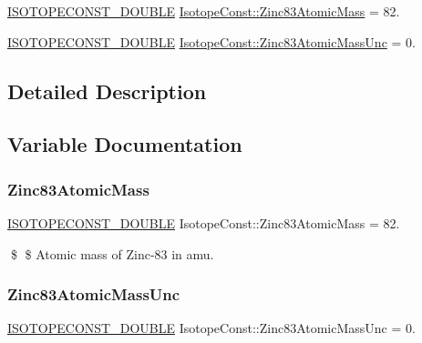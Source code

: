 \begin{DoxyCompactItemize}
\item 
\mbox{\hyperlink{group___isotope_const-_macros_ga8f45a7272ce02c0b4c65c44636ed719a}{I\+S\+O\+T\+O\+P\+E\+C\+O\+N\+S\+T\+\_\+\+D\+O\+U\+B\+LE}} \mbox{\hyperlink{group___isotope_const-_zinc-_zn83_gacfdde01fd0df7ff864f4a9a940978585}{Isotope\+Const\+::\+Zinc83\+Atomic\+Mass}} = 82.
\item 
\mbox{\hyperlink{group___isotope_const-_macros_ga8f45a7272ce02c0b4c65c44636ed719a}{I\+S\+O\+T\+O\+P\+E\+C\+O\+N\+S\+T\+\_\+\+D\+O\+U\+B\+LE}} \mbox{\hyperlink{group___isotope_const-_zinc-_zn83_gad2eb422eec9bb0897e5acf2d842ec742}{Isotope\+Const\+::\+Zinc83\+Atomic\+Mass\+Unc}} = 0.
\end{DoxyCompactItemize}


\subsection{Detailed Description}


\subsection{Variable Documentation}
\mbox{\label{group___isotope_const-_zinc-_zn83_gacfdde01fd0df7ff864f4a9a940978585}} 
\subsubsection{\texorpdfstring{Zinc83\+Atomic\+Mass}{Zinc83AtomicMass}}
{\footnotesize\ttfamily \mbox{\hyperlink{group___isotope_const-_macros_ga8f45a7272ce02c0b4c65c44636ed719a}{I\+S\+O\+T\+O\+P\+E\+C\+O\+N\+S\+T\+\_\+\+D\+O\+U\+B\+LE}} Isotope\+Const\+::\+Zinc83\+Atomic\+Mass = 82.}

\$ \$ Atomic mass of Zinc-\/83 in amu. \mbox{\label{group___isotope_const-_zinc-_zn83_gad2eb422eec9bb0897e5acf2d842ec742}} 
\subsubsection{\texorpdfstring{Zinc83\+Atomic\+Mass\+Unc}{Zinc83AtomicMassUnc}}
{\footnotesize\ttfamily \mbox{\hyperlink{group___isotope_const-_macros_ga8f45a7272ce02c0b4c65c44636ed719a}{I\+S\+O\+T\+O\+P\+E\+C\+O\+N\+S\+T\+\_\+\+D\+O\+U\+B\+LE}} Isotope\+Const\+::\+Zinc83\+Atomic\+Mass\+Unc = 0.}

